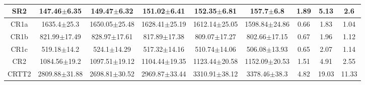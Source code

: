 \documentclass[12pt]{paper}
\begin{document}
\begin{table}[ht]
\begin{center}
{\begin{tabular}{c|ccccc|c|c|c}
\hline
SR2 & 147.46$\pm$6.35 & 149.47$\pm$6.32 & 151.02$\pm$6.41 & 152.35$\pm$6.81 & 157.7$\pm$6.8 & 1.89 & 5.13 & 2.6\\ 
\hline
\hline
CR1a & 1635.4$\pm$25.3 & 1650.05$\pm$25.48 & 1628.41$\pm$25.19 & 1612.14$\pm$25.05 & 1598.84$\pm$24.86 & 0.66 & 1.83 & 1.04\\ 
CR1b & 821.99$\pm$17.49 & 828.97$\pm$17.61 & 817.89$\pm$17.38 & 809.07$\pm$17.27 & 802.66$\pm$17.15 & 0.67 & 1.96 & 1.12\\ 
CR1c & 519.18$\pm$14.2 & 524.1$\pm$14.29 & 517.32$\pm$14.16 & 510.74$\pm$14.06 & 506.08$\pm$13.93 & 0.65 & 2.07 & 1.14\\ 
CR2 & 1084.56$\pm$19.2 & 1097.51$\pm$19.12 & 1104.44$\pm$19.35 & 1123.44$\pm$20.58 & 1152.09$\pm$20.53 & 1.51 & 4.91 & 2.55\\ 
CRTT2 & 2809.88$\pm$31.88 & 2698.81$\pm$30.52 & 2969.87$\pm$33.44 & 3310.91$\pm$38.12 & 3378.46$\pm$38.3 & 4.82 & 19.03 & 11.33\\ 

\end{tabular}}
\end{center}\caption*{}\end{table}
\end{document}
